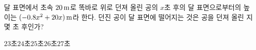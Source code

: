 달 표면에서 초속 $20\mkern3mu \mathrm{m}$로 똑바로 위로 던져 올린 공의 $x$초 후의 달 표면으로부터의 높이는 $(-0.8x^2+20x)\mkern3mu \mathrm{m}$라 한다. 던진 공이 달 표면에 떨어지는 것은 공을 던져 올린 지 몇 초 후인가?
\begin{choices32}{$23$초}{$24$초}{$25$초}{$26$초}{$27$초}\end{choices32}
